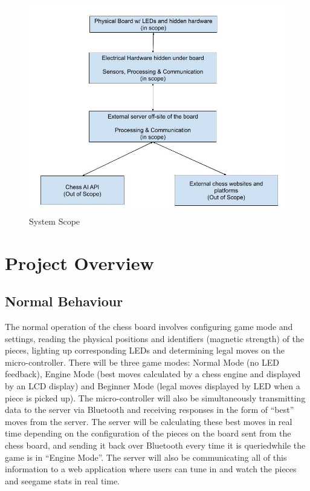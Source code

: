 \documentclass[12pt, titlepage]{article}
\begin{document}
\begin{figure}[H]
  \begin{center}
    \includegraphics[scale=0.45]{scope.jpg}
    \caption{System Scope}
    \label{Fig_Scope} 
  \end{center}
\end{figure}

\section{Project Overview}

\subsection{Normal Behaviour}{
The normal operation of the chess board involves configuring game mode and settings, reading the physical 
positions and identifiers (magnetic strength) of the pieces, lighting up corresponding LEDs and determining 
legal moves on the micro-controller. There will be three game modes: Normal Mode (no LED feedback), Engine 
Mode (best moves calculated by a chess engine and displayed by an LCD display) and Beginner Mode (legal moves
 displayed by LED when a piece is picked up). The micro-controller will also be simultaneously transmitting 
 data to the server via Bluetooth and receiving responses in the form of ``best'' moves from the server. The 
 server will be calculating these best moves in real time depending on the configuration of the pieces on the 
 board sent from the chess board, and sending it back over Bluetooth every time it is queriedwhile the game is
  in ``Engine Mode''. The server will also be communicating all of this information to a web application where 
  users can tune in and watch the pieces and seegame stats in real time.
}
\end{document}
